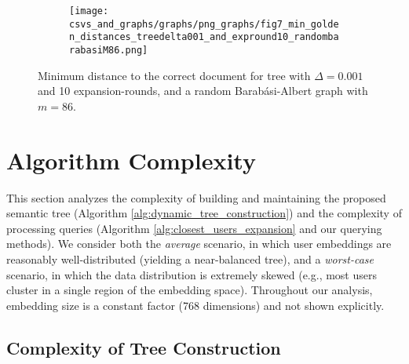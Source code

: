 \documentclass[10pt,journal]{IEEEtran}
\begin{document}
%             
\begin{figure}
    \centering
    \begin{subfigure}[b]{0.45\textwidth} %
        \texttt{[image: csvs\_and\_graphs/graphs/png\_graphs/fig7\_min\_golden\_distances\_treedelta001\_and\_expround10\_randombarabasiM86.png]}
    \end{subfigure}
    \hfill
    \caption{Minimum distance to the correct document for tree with $\Delta = 0.001$ and 10 expansion-rounds, and a random Barabási-Albert graph with $m = 86$.}
    \label{fig:min_golden_distance}
\end{figure}




\section{Algorithm Complexity}
\label{sec:complexity}

This section analyzes the complexity of building and maintaining the proposed semantic tree 
(Algorithm \ref{alg:dynamic_tree_construction}) 
and the complexity of processing queries 
(Algorithm \ref{alg:closest_users_expansion} 
and our querying methods). We consider both the \emph{average} scenario, in which user embeddings are reasonably well-distributed (yielding a near-balanced tree), and a \emph{worst-case} scenario, in which the data distribution is extremely skewed (e.g., most users cluster in a single region of the embedding space). Throughout our analysis, embedding size is a constant factor (768 dimensions) and not shown explicitly.

\subsection{Complexity of Tree Construction}
\end{document}
